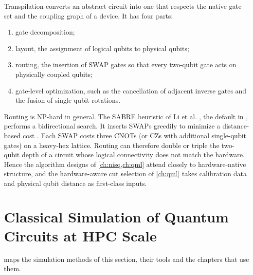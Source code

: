Transpilation converts an abstract circuit into one that respects the native gate set and the coupling graph of a device. It has four parts:
\begin{enumerate}
\item gate decomposition;
\item layout, the assignment of logical qubits to physical qubits;
\item routing, the insertion of SWAP gates so that every two-qubit gate acts on physically coupled qubits;
\item gate-level optimization, such as the cancellation of adjacent inverse gates and the fusion of single-qubit rotations.
\end{enumerate}
Routing is NP-hard in general. The SABRE heuristic of Li et al. \cite{li2019sabre}, the default in \qiskit{}, performs a bidirectional search. It inserts SWAPs greedily to minimize a distance-based cost \cite{javadiabhari2024qiskit}. Each SWAP costs three CNOTs (or CZs with additional single-qubit gates) on a heavy-hex lattice. Routing can therefore double or triple the two-qubit depth of a circuit whose logical connectivity does not match the hardware. Hence the algorithm designs of \cref{ch:nisq,ch:qml} attend closely to hardware-native structure, and the hardware-aware cut selection of \cref{ch:qml} takes calibration data and physical qubit distance as first-class inputs.

\section{Classical Simulation of Quantum Circuits at HPC Scale}\label{sec:bg:sim}

 maps the simulation methods of this section, their tools and the chapters that use them.

